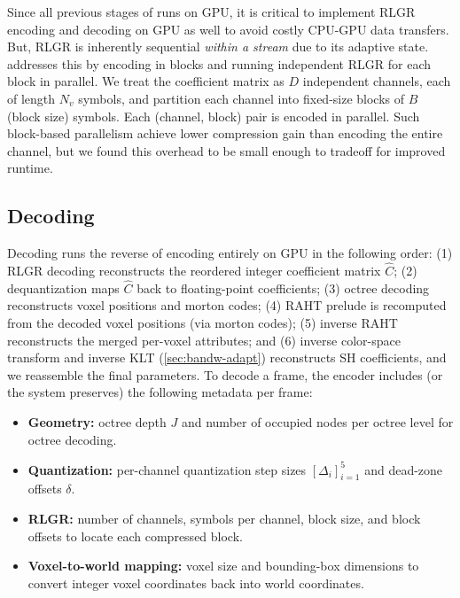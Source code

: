 Since all previous stages of \gsnfs runs on GPU, it is critical to implement RLGR encoding and decoding on GPU as well to avoid costly CPU-GPU data transfers.
%
But, RLGR is inherently sequential \emph{within a stream} due to its adaptive state.
%
\gsnfs addresses this by encoding in blocks and running independent RLGR for each block in parallel.
%
We treat the coefficient matrix as $D$ independent channels, each of length $N_v$ symbols, and partition each channel into fixed-size blocks of $B$ (block size) symbols.
%
Each (channel, block) pair is encoded in parallel.
%
Such block-based parallelism achieve lower compression gain than encoding the entire channel, but we found this overhead to be small enough to tradeoff for improved runtime.

\subsection{Decoding}\label{sec:decoding}
Decoding runs the reverse of encoding entirely on GPU in the following order:
(1) RLGR decoding reconstructs the reordered integer coefficient matrix $\hat{C}$;
(2) dequantization maps $\hat{C}$ back to floating-point coefficients;
(3) octree decoding reconstructs voxel positions and morton codes;
(4) RAHT prelude is recomputed from the decoded voxel positions (via morton codes);
(5) inverse RAHT reconstructs the merged per-voxel attributes; and
(6) inverse color-space transform and inverse KLT (\cref{sec:bandw-adapt}) reconstructs SH coefficients, and we reassemble the final \gs parameters.
To decode a frame, the encoder includes (or the system preserves) the following metadata per frame:
\begin{itemize}
%
\item \textbf{Geometry:} octree depth $J$ and number of occupied nodes per octree level for octree decoding.
%
\item \textbf{Quantization:} per-channel quantization step sizes $[\Delta_i]_{i=1}^5$ and dead-zone offsets $\delta$.
%
\item \textbf{RLGR:} number of channels, symbols per channel, block size, and block offsets to locate each compressed block.
%
\item \textbf{Voxel-to-world mapping:} voxel size and bounding-box dimensions to convert integer voxel coordinates back into world coordinates.
\end{itemize}
